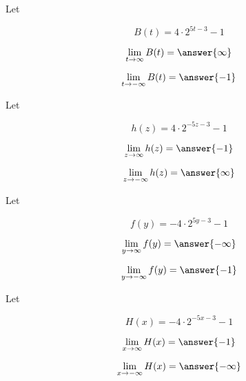 \documentclass{ximera}
\author{Lee Wayand}
\begin{document}
\begin{exercise}


\begin{question}



Let 

\[
B(t) = 4 \cdot 2^{5t - 3} - 1
\]



\[
\lim\limits_{t \to \infty} B(t) = \answer{\infty}
\]



\[
\lim\limits_{t \to -\infty} B(t) = \answer{-1}
\]

\end{question}







\begin{question}



Let 

\[
h(z) = 4 \cdot 2^{-5z - 3} - 1
\]


\[
\lim\limits_{z \to \infty} h(z) = \answer{-1}
\]



\[
\lim\limits_{z \to -\infty} h(z) = \answer{\infty}
\]

\end{question}





\begin{question}



Let 

\[
f(y) = -4 \cdot 2^{5y - 3} - 1
\]


\[
\lim\limits_{y \to \infty} f(y) = \answer{-\infty}
\]



\[
\lim\limits_{y \to -\infty} f(y) = \answer{-1}
\]


\end{question}





\begin{question}



Let 

\[
H(x) = -4 \cdot 2^{-5x - 3} - 1
\]


\[
\lim\limits_{x \to \infty} H(x) = \answer{-1}
\]



\[
\lim\limits_{x \to -\infty} H(x) = \answer{-\infty}
\]

\end{question}








\end{exercise}
\end{document}
